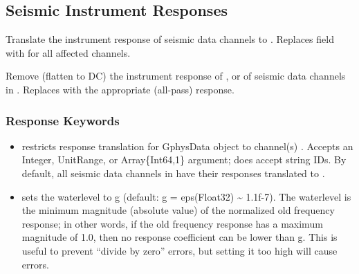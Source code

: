 \documentclass[letterpaper,11pt,english]{sphinxmanual}
\begin{document}
\subsection{Seismic Instrument Responses}
\label{\detokenize{src/Processing/processing:seismic-instrument-responses}}

\begin{fulllineitems}
\end{fulllineitems}



\begin{fulllineitems}
\end{fulllineitems}


Translate the instrument response of seismic data channels to .
Replaces field  with  for all affected channels.


\begin{fulllineitems}
\pysigline{\sphinxbfcode{\sphinxupquote{remove\_resp!(S,~chans=CC,~wl=g{]})}}}
\end{fulllineitems}



\begin{fulllineitems}
\pysigline{\sphinxbfcode{\sphinxupquote{remove\_resp!(Ch,~wl=g{]})}}}
\end{fulllineitems}


Remove (flatten to DC) the instrument response of , or of seismic data
channels  in . Replaces  with the appropriate (all-pass)
response.


\subsubsection{Response Keywords}
\label{\detokenize{src/Processing/processing:response-keywords}}\begin{itemize}
\item {} 
 restricts response translation for GphysData object  to channel(s) . Accepts an Integer, UnitRange, or Array\{Int64,1\} argument; does  accept string IDs. By default, all seismic data channels in  have their responses translated to .

\item {} 
 sets the waterlevel to g (default: g = eps(Float32) \textasciitilde{} 1.1f-7). The waterlevel is the minimum magnitude (absolute value) of the normalized old frequency response; in other words, if the old frequency response has a maximum magnitude of 1.0, then no response coefficient can be lower than g. This is useful to prevent “divide by zero” errors, but setting it too high will cause errors.

\end{itemize}
\end{document}
